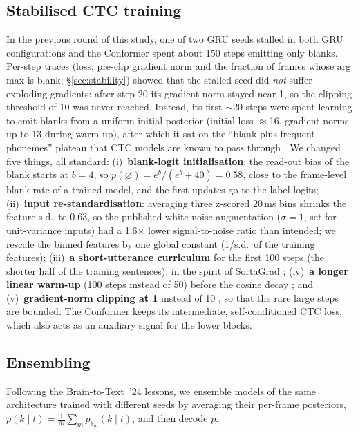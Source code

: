 \subsection{Stabilised CTC training}
\label{sec:stable}
In the previous round of this study, one of two GRU seeds stalled in both GRU configurations and the Conformer spent about 150 steps emitting only blanks. Per-step traces (loss, pre-clip gradient norm and the fraction of frames whose arg\,max is blank; \S\ref{sec:stability}) showed that the stalled seed did \emph{not} suffer exploding gradients: after step 20 its gradient norm stayed near 1, so the clipping threshold of 10 was never reached. Instead, its first $\sim$20 steps were spent learning to emit blanks from a uniform initial posterior (initial loss $\approx$16, gradient norms up to 13 during warm-up), after which it sat on the ``blank plus frequent phonemes'' plateau that CTC models are known to pass through \citep{zeyer2021peaky}. We changed five things, all standard:
(i)~\textbf{blank-logit initialisation}: the read-out bias of the blank starts at $b{=}4$, so $p(\varnothing)=e^{b}/(e^{b}+40)=0.58$, close to the frame-level blank rate of a trained model, and the first updates go to the label logits;
(ii)~\textbf{input re-standardisation}: averaging three z-scored 20\,ms bins shrinks the feature s.d.\ to 0.63, so the published white-noise augmentation ($\sigma{=}1$, set for unit-variance inputs) had a 1.6$\times$ lower signal-to-noise ratio than intended; we rescale the binned features by one global constant (1/s.d.\ of the training features);
(iii)~\textbf{a short-utterance curriculum} for the first 100 steps (the shorter half of the training sentences), in the spirit of SortaGrad \citep{amodei2016deepspeech2};
(iv)~\textbf{a longer linear warm-up} (100 steps instead of 50) before the cosine decay \citep{loshchilov2017sgdr}; and
(v)~\textbf{gradient-norm clipping at 1} instead of 10 \citep{pascanu2013difficulty}, so that the rare large steps are bounded.
The Conformer keeps its intermediate, self-conditioned CTC loss, which also acts as an auxiliary signal for the lower blocks.

\subsection{Ensembling}
Following the Brain-to-Text~'24 lessons, we ensemble models of the same architecture trained with different seeds by averaging their per-frame posteriors, $\bar p(k\mid t)=\tfrac1M\sum_m p_{\theta_m}(k\mid t)$, and then decode $\bar p$.

